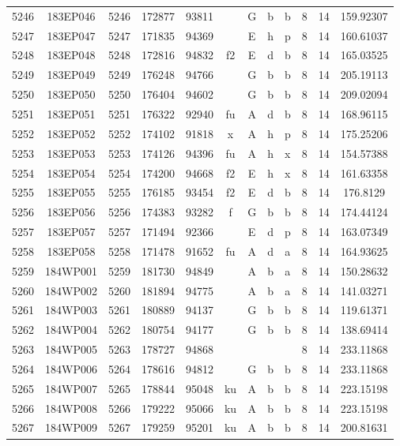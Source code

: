 \begin{tabular}{|*{12}{c|}}
5246 & 183EP046 & 5246 & 172877 & 93811 &  & G & b & b & 8 & 14 & 159.92307 \\ 
5247 & 183EP047 & 5247 & 171835 & 94369 &  & E & h & p & 8 & 14 & 160.61037 \\ 
5248 & 183EP048 & 5248 & 172816 & 94832 & f2 & E & d & b & 8 & 14 & 165.03525 \\ 
5249 & 183EP049 & 5249 & 176248 & 94766 &  & G & b & b & 8 & 14 & 205.19113 \\ 
5250 & 183EP050 & 5250 & 176404 & 94602 &  & G & b & b & 8 & 14 & 209.02094 \\ 
5251 & 183EP051 & 5251 & 176322 & 92940 & fu & A & d & b & 8 & 14 & 168.96115 \\ 
5252 & 183EP052 & 5252 & 174102 & 91818 & x & A & h & p & 8 & 14 & 175.25206 \\ 
5253 & 183EP053 & 5253 & 174126 & 94396 & fu & A & h & x & 8 & 14 & 154.57388 \\ 
5254 & 183EP054 & 5254 & 174200 & 94668 & f2 & E & h & x & 8 & 14 & 161.63358 \\ 
5255 & 183EP055 & 5255 & 176185 & 93454 & f2 & E & d & b & 8 & 14 & 176.8129 \\ 
5256 & 183EP056 & 5256 & 174383 & 93282 & f & G & b & b & 8 & 14 & 174.44124 \\ 
5257 & 183EP057 & 5257 & 171494 & 92366 &  & E & d & p & 8 & 14 & 163.07349 \\ 
5258 & 183EP058 & 5258 & 171478 & 91652 & fu & A & d & a & 8 & 14 & 164.93625 \\ 
5259 & 184WP001 & 5259 & 181730 & 94849 &  & A & b & a & 8 & 14 & 150.28632 \\ 
5260 & 184WP002 & 5260 & 181894 & 94775 &  & A & b & a & 8 & 14 & 141.03271 \\ 
5261 & 184WP003 & 5261 & 180889 & 94137 &  & G & b & b & 8 & 14 & 119.61371 \\ 
5262 & 184WP004 & 5262 & 180754 & 94177 &  & G & b & b & 8 & 14 & 138.69414 \\ 
5263 & 184WP005 & 5263 & 178727 & 94868 &  &  &  &  & 8 & 14 & 233.11868 \\ 
5264 & 184WP006 & 5264 & 178616 & 94812 &  & G & b & b & 8 & 14 & 233.11868 \\ 
5265 & 184WP007 & 5265 & 178844 & 95048 & ku & A & b & b & 8 & 14 & 223.15198 \\ 
5266 & 184WP008 & 5266 & 179222 & 95066 & ku & A & b & b & 8 & 14 & 223.15198 \\ 
5267 & 184WP009 & 5267 & 179259 & 95201 & ku & A & b & b & 8 & 14 & 200.81631 \\ 

\end{tabular}
